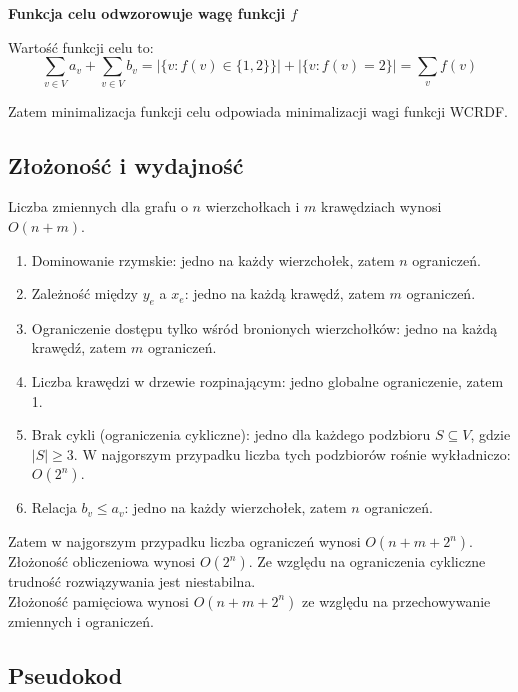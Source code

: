 \textbf{Funkcja celu odwzorowuje wagę funkcji $f$}

Wartość funkcji celu to:
\[
\sum_{v \in V} a_v + \sum_{v \in V} b_v = |\{v : f(v) \in \{1,2\}\}| + |\{v : f(v) = 2\}|
= \sum_{v} f(v)
\]

Zatem minimalizacja funkcji celu odpowiada minimalizacji wagi funkcji WCRDF.

\subsection{Złożoność i wydajność}

Liczba zmiennych dla grafu o $n$ wierzchołkach i $m$ krawędziach wynosi $O(n+m)$.

\begin{enumerate}
    \item Dominowanie rzymskie: jedno na każdy wierzchołek, zatem $n$ ograniczeń.   
    \item Zależność między \( y_e \) a \( x_e \): jedno na każdą krawędź, zatem $m$ ograniczeń.    
    \item Ograniczenie dostępu tylko wśród bronionych wierzchołków: jedno na każdą krawędź, zatem $m$ ograniczeń.    
    \item Liczba krawędzi w drzewie rozpinającym: jedno globalne ograniczenie, zatem 1.  
    \item Brak cykli (ograniczenia cykliczne): jedno dla każdego podzbioru \( S \subseteq V \), gdzie \( |S| \geq 3 \). W najgorszym przypadku liczba tych podzbiorów rośnie wykładniczo: $O(2^n)$.  
    \item Relacja \( b_v \leq a_v \): jedno na każdy wierzchołek, zatem $n$ ograniczeń.
\end{enumerate}

Zatem w najgorszym przypadku liczba ograniczeń wynosi $	O(n+m+2^n)$.
Złożoność obliczeniowa wynosi $O(2^n)$. Ze względu na ograniczenia cykliczne trudność rozwiązywania jest niestabilna.\\
Złożoność pamięciowa wynosi $O(n+m+2^n)$ ze względu na przechowywanie zmiennych i ograniczeń.

\subsection{Pseudokod}

